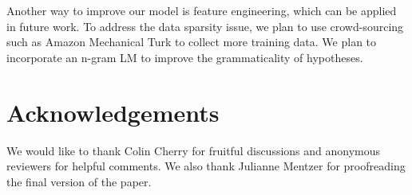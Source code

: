 \documentclass[10pt]{article}
\begin{document}
Another way to improve our model is feature engineering, which can be applied in future work.
To address the data sparsity issue, we plan to use crowd-sourcing such as Amazon Mechanical Turk to collect more training data.
We plan to incorporate an n-gram LM to improve the grammaticality of hypotheses.

\section*{Acknowledgements}

We would like to thank Colin Cherry for fruitful discussions and anonymous reviewers for helpful comments.
We also thank Julianne Mentzer for proofreading the final version of the paper. 
%
%


%
\begin{small}

\end{small}
\end{document}
